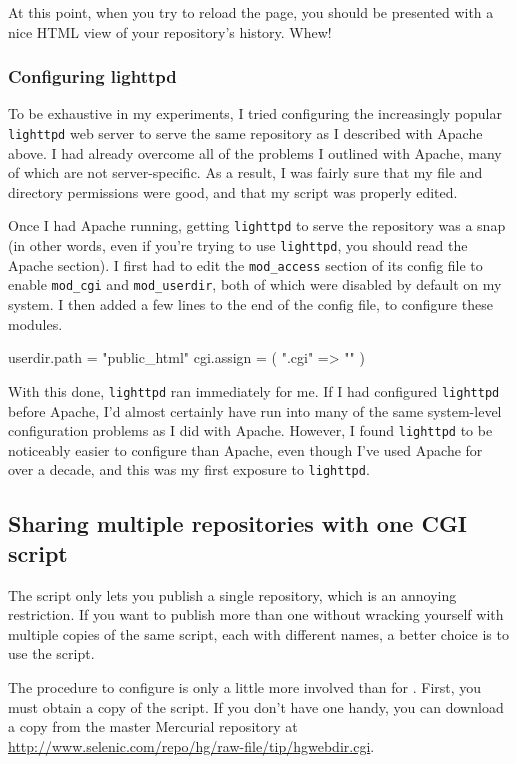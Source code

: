 At this point, when you try to reload the page, you should be
presented with a nice HTML view of your repository's history.  Whew!

\subsubsection{Configuring lighttpd}

To be exhaustive in my experiments, I tried configuring the
increasingly popular \texttt{lighttpd} web server to serve the same
repository as I described with Apache above.  I had already overcome
all of the problems I outlined with Apache, many of which are not
server-specific.  As a result, I was fairly sure that my file and
directory permissions were good, and that my 
script was properly edited.

Once I had Apache running, getting \texttt{lighttpd} to serve the
repository was a snap (in other words, even if you're trying to use
\texttt{lighttpd}, you should read the Apache section).  I first had
to edit the \texttt{mod\_access} section of its config file to enable
\texttt{mod\_cgi} and \texttt{mod\_userdir}, both of which were
disabled by default on my system.  I then added a few lines to the end
of the config file, to configure these modules.
\begin{codesample2}
  userdir.path = "public_html"
  cgi.assign = ( ".cgi" => "" )
\end{codesample2}
With this done, \texttt{lighttpd} ran immediately for me.  If I had
configured \texttt{lighttpd} before Apache, I'd almost certainly have
run into many of the same system-level configuration problems as I did
with Apache.  However, I found \texttt{lighttpd} to be noticeably
easier to configure than Apache, even though I've used Apache for over
a decade, and this was my first exposure to \texttt{lighttpd}.

\subsection{Sharing multiple repositories with one CGI script}

The  script only lets you publish a single
repository, which is an annoying restriction.  If you want to publish
more than one without wracking yourself with multiple copies of the
same script, each with different names, a better choice is to use the
 script.

The procedure to configure  is only a little
more involved than for .  First, you must obtain
a copy of the script.  If you don't have one handy, you can download a
copy from the master Mercurial repository at
\url{http://www.selenic.com/repo/hg/raw-file/tip/hgwebdir.cgi}.

